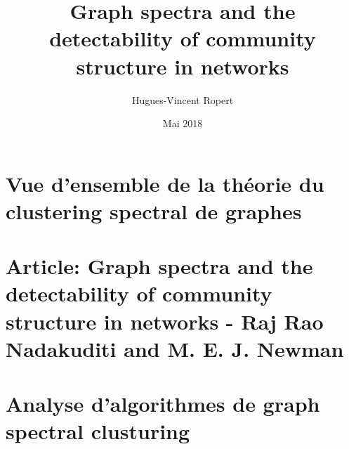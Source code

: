 \documentclass{article} %
\title{Graph spectra and the detectability of community structure in networks}
\author{Hugues-Vincent Ropert}
\date{Mai 2018}
\begin{document}
\maketitle

\tableofcontents

\part{Vue d'ensemble de la théorie du clustering spectral de graphes}



\part{Article: Graph spectra and the detectability of community structure in networks - Raj Rao Nadakuditi and M. E. J. Newman}




\nocite{*}

\part{Analyse d'algorithmes de graph spectral clusturing}




\end{document}
